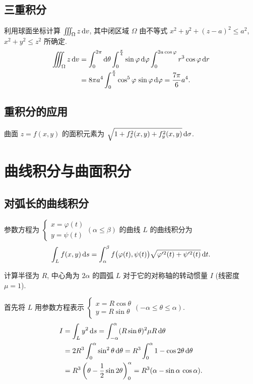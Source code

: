 \documentclass[a4paper,10pt,fleqn]{article}
\begin{document}
\subsection{三重积分}

\begin{exmp}
    利用球面坐标计算 $\iiint_\Omega z\,{\rm d}v$, 其中闭区域 $\Omega$ 由不等式 $x^2+y^2+(z-a)^2\leq a^2$,
    $x^2+y^2\leq z^2$ 所确定.
    \begin{align*}
        \iiint_\Omega z\,{\rm d}v & = \int_0^{2\pi}{\rm d}\theta\int_0^{\frac{\pi}{4}}\sin\varphi\,{\rm d}\varphi\int_0^{2a\cos\varphi}r^3\cos\varphi\,{\rm d}r \\
                                  & =8\pi a^4\int_0^{\frac{\pi}{4}}\cos^5\varphi\,\sin\varphi\,{\rm d}\varphi=\frac{7\pi}{6}a^4.
    \end{align*}
\end{exmp}

\subsection{重积分的应用}

曲面 $z=f(x,y)$ 的面积元素为 $\sqrt{1+f_x^2(x,y)+f_y^2(x,y)}\,{\rm d}\sigma$.

\section{曲线积分与曲面积分}

\subsection{对弧长的曲线积分}

\begin{thm}
    参数方程为 $\begin{cases}x=\varphi(t)\\y=\psi(t)\end{cases}(\alpha\leq\beta)$ 的曲线 $L$ 的曲线积分为
    \[
        \int_Lf(x,y)\,{\rm d}s=\int_\alpha^\beta f\big(\varphi(t),\psi(t)\big)\sqrt{\varphi'^2(t)+\psi'^2(t)}\,{\rm d}t.
    \]
\end{thm}

\begin{exmp}
    计算半径为 $R$, 中心角为 $2\alpha$ 的圆弧 $L$ 对于它的对称轴的转动惯量 $I$ (线密度 $\mu=1$).

    首先将 $L$ 用参数方程表示 $\begin{cases}x=R\cos\theta\\y=R\sin\theta\end{cases}(-\alpha\leq\theta\leq\alpha)$.
    \begin{align*}
        I & =\int_Ly^2\,{\rm d}s=\int_{-\alpha}^\alpha(R\sin\theta)^2\mu R\,{\rm d}\theta                \\
          & =2R^3\int_0^\alpha\sin^2\theta\,{\rm d}\theta=R^3\int_0^\alpha1-\cos2\theta\,{\rm d}\theta  \\
          & =R^3\left(\theta-\frac{1}{2}\sin2\theta\right)_0^\alpha=R^3(\alpha-\sin\alpha\,\cos\alpha).
    \end{align*}
\end{exmp}
\end{document}
